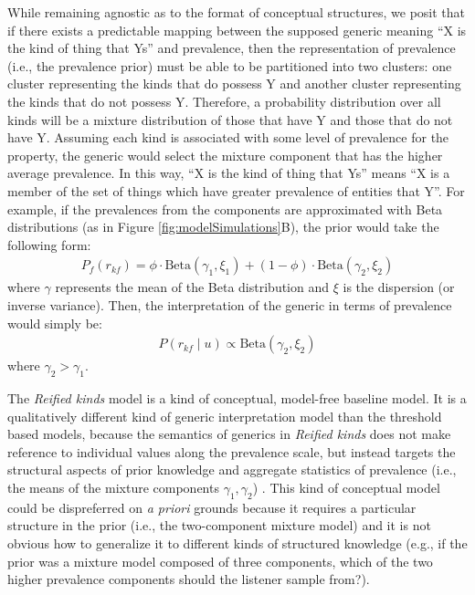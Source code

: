 \documentclass[floatsintext,man]{apa6}
\begin{document}
While remaining agnostic as to the format of conceptual structures, we posit that if there exists a predictable mapping between the supposed generic meaning ``X is the kind of thing that Ys'' and prevalence, then the representation of prevalence (i.e., the prevalence prior) must be able to be partitioned into two clusters: one cluster representing the kinds that do possess Y and another cluster representing the kinds that do not possess Y. 
Therefore, a probability distribution over all kinds will be a mixture distribution of those that have Y and those that do not have Y. 
Assuming each kind is associated with some level of prevalence for the property, the generic would select the mixture component that has the higher average prevalence.
In this way, ``X is the kind of thing that Ys'' means ``X is a member of the set of things which have greater prevalence of entities that Y''.
For example, if the prevalences from the components are approximated with Beta distributions (as in Figure \ref{fig:modelSimulations}B), the prior would take the following form:
\begin{eqnarray}
P_f(r_{kf}) = \phi \cdot \text{Beta}(\gamma_1, \xi_1) + (1-\phi)\cdot \text{Beta}(\gamma_2, \xi_2)
\end{eqnarray}
\noindent where $\gamma$ represents the mean of the Beta distribution and $\xi$ is the dispersion (or inverse variance).
Then, the interpretation of the generic in terms of prevalence would simply be:
%
\begin{eqnarray}
P (r_{kf} \mid u) \propto  \text{Beta}(\gamma_2, \xi_2) \label{eq:rk}
\end{eqnarray}
%
\noindent where $\gamma_2 > \gamma_1$. 

The \emph{Reified kinds} model is a kind of conceptual, model-free baseline model.
It is a qualitatively different kind of generic interpretation model than the threshold based models, because the semantics of generics in \emph{Reified kinds} does not make reference to individual values along the prevalence scale, but instead targets the structural aspects of prior knowledge and aggregate statistics of prevalence (i.e., the means of the mixture components $\gamma_1, \gamma_2$) . 
This kind of conceptual model could be dispreferred on \emph{a priori} grounds because it requires a particular structure in the prior (i.e., the two-component mixture model) and it is not obvious how to  generalize it to different kinds of structured knowledge (e.g., if the prior was a mixture model composed of three components, which of the two higher prevalence components should the listener sample from?).
\end{document}
